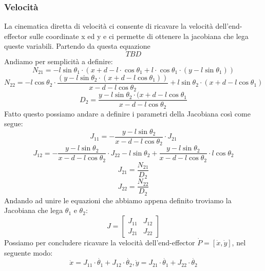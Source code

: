 \subsubsection{Velocità}\label{sec:CalcoloVelCin}
La cinematica diretta di velocità ci consente di ricavare la velocità dell'end-effector sulle coordinate x ed y e ci permette di ottenere la jacobiana che lega queste variabili. Partendo da questa equazione
\begin{equation}
    TBD
\end{equation}
Andiamo per semplicità a definire:
\begin{equation*}
    N_{21} = -l\sin\theta_1\cdot (x+d-l\cdot \cos\theta_1 + l\cdot \cos\theta_1\cdot (y-l\sin\theta_1))
\end{equation*}
\begin{equation*}
    N_{22} = -l\cos\theta_2\cdot \frac{(y-l\sin\theta_2\cdot (x+d-l\cos\theta_1))}{x-d-l \cos\theta_2} +l\sin\theta_2\cdot(x+d-l\cos\theta_1)
\end{equation*}
\begin{equation*}
 D_2 = \frac{y-l\sin\theta_2\cdot (x+d-l\cos\theta_1}{x-d-l\cos\theta_2}
\end{equation*}
Fatto questo possiamo andare a definire i parametri della Jacobiana così come segue:
\begin{equation*}
    J_{11} = -\frac{y-l\sin\theta_2}{x-d-l\cos\theta_2}\cdot J_{21}
\end{equation*}
\begin{equation*}
    J_{12} = -\frac{y-l\sin\theta_2}{x-d-l\cos\theta_2}\cdot J_{22} - l\sin\theta_2 + \frac{y-l\sin\theta_2}{x-d-l\cos\theta_2}\cdot l\cos\theta_2
\end{equation*}
\begin{equation*}
    J_{21} = \frac{N_{21}}{D_2}
\end{equation*}
\begin{equation*}
    J_{22} = \frac{N_{22}}{D_2}
\end{equation*}
Andando ad unire le equazioni che abbiamo appena definito troviamo la Jacobiana che lega $\theta_1$ e $\theta_2$:
\begin{equation}
    J = \begin{bmatrix}
    J_{11} & J_{12} \\ J_{21} & J_{22}
    \end{bmatrix}
    \label{eq:J12}
\end{equation}
Possiamo per concludere ricavare la velocità dell'end-effector $\dot{P} = [\dot{x},\dot{y}]$, nel seguente modo:
\begin{equation}
    \dot{x} = J_{11}\cdot \dot{\theta_1} + J_{12}\cdot\dot{\theta_2}, \dot{y} = J_{21}\cdot \dot{\theta_1}+J_{22}\cdot\dot{\theta_2}
\end{equation}
